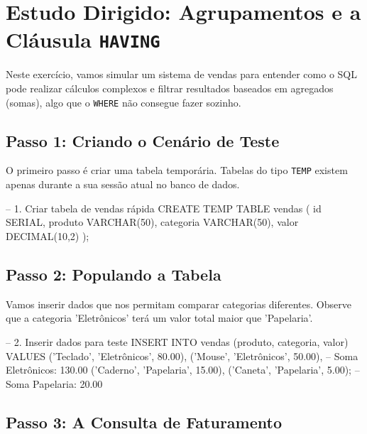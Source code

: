 \section{Estudo Dirigido: Agrupamentos e a Cláusula \texttt{HAVING}}

\begin{tcolorbox}[colback=green!5,colframe=green!40!black,title=Objetivo da Atividade]
Neste exercício, vamos simular um sistema de vendas para entender como o SQL pode realizar cálculos complexos e filtrar resultados baseados em agregados (somas), algo que o \texttt{WHERE} não consegue fazer sozinho.
\end{tcolorbox}

\subsection{Passo 1: Criando o Cenário de Teste}

O primeiro passo é criar uma tabela temporária. Tabelas do tipo \texttt{TEMP} existem apenas durante a sua sessão atual no banco de dados.

\begin{sqlcode}
-- 1. Criar tabela de vendas rápida
CREATE TEMP TABLE vendas (
    id SERIAL,
    produto VARCHAR(50),
    categoria VARCHAR(50),
    valor DECIMAL(10,2)
);
\end{sqlcode}

\subsection{Passo 2: Populando a Tabela}

Vamos inserir dados que nos permitam comparar categorias diferentes. Observe que a categoria 'Eletrônicos' terá um valor total maior que 'Papelaria'.

\begin{sqlcode}
-- 2. Inserir dados para teste
INSERT INTO vendas (produto, categoria, valor) VALUES
('Teclado', 'Eletrônicos', 80.00),
('Mouse',   'Eletrônicos', 50.00),  -- Soma Eletrônicos: 130.00
('Caderno', 'Papelaria',   15.00),
('Caneta',  'Papelaria',    5.00);  -- Soma Papelaria: 20.00
\end{sqlcode}

\subsection{Passo 3: A Consulta de Faturamento}



